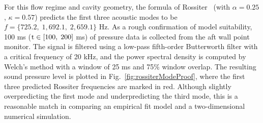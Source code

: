 For this flow regime and cavity geometry, the formula of Rossiter~\cite{Rossiter1964} (with $\alpha = 0.25$, $\kappa = 0.57$) predicts the first three acoustic modes to be $f = \{725.2, \; 1,692.1, \; 2,659.1\}$ Hz. As a rough confirmation of model suitability, 100 ms ($\text{t} \in [100, \; 200]$ ms) of pressure data is collected from the aft wall point monitor. The signal is filtered using a low-pass fifth-order Butterworth filter with a critical frequency of 20 kHz, and the power spectral density is computed by Welch's method with a window of 25 ms and 75\% window overlap. The resulting sound pressure level is plotted in Fig.~\ref{fig:rossiterModeProof}, where the first three predicted Rossiter frequencies are marked in red. Although slightly overpredicting the first mode and underpredicting the third mode, this is a reasonable match in comparing an empirical fit model and a two-dimensional numerical simulation.

